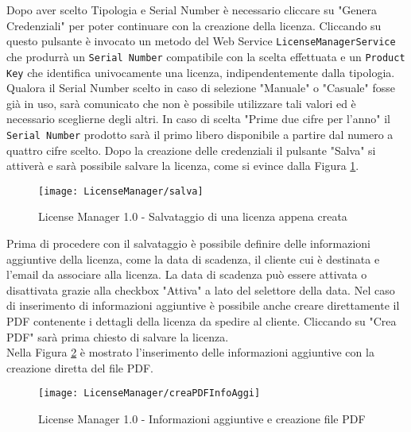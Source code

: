 Dopo aver scelto Tipologia e Serial Number è necessario cliccare su "Genera Credenziali" per poter continuare con la creazione della licenza. Cliccando su questo pulsante è invocato un metodo del Web Service \texttt{LicenseManagerService} che produrrà un \texttt{Serial Number} compatibile con la scelta effettuata e un \texttt{Product Key} che identifica univocamente una licenza, indipendentemente dalla tipologia. Qualora il Serial Number scelto in caso di selezione "Manuale" o "Casuale" fosse già in uso, sarà comunicato che non è possibile utilizzare tali valori ed è necessario sceglierne degli altri. In caso di scelta "Prime due cifre per l’anno" il \texttt{Serial Number} prodotto sarà il primo libero disponibile a partire dal numero a quattro cifre scelto. Dopo la creazione delle credenziali il pulsante "Salva" si attiverà e sarà possibile salvare la licenza, come si evince dalla Figura \ref{salva}.

 \begin{figure}[!h] 
    \centering 
    \texttt{[image: LicenseManager/salva]} 
    \caption{License Manager 1.0 - Salvataggio di una licenza appena creata}
\label{salva}
\end{figure}

Prima di procedere con il salvataggio è possibile definire delle informazioni aggiuntive della licenza, come la data di scadenza, il cliente cui è destinata e l’email da associare alla licenza. La data di scadenza può essere attivata o disattivata grazie alla checkbox "Attiva" a lato del selettore della data. Nel caso di inserimento di informazioni aggiuntive è possibile anche creare direttamente il PDF contenente i dettagli della licenza da spedire al cliente. Cliccando su "Crea PDF" sarà prima chiesto di salvare la licenza.
\\Nella Figura \ref{pdf} è mostrato l'inserimento delle informazioni aggiuntive con la creazione diretta del file PDF.


\begin{figure}[!h] 
    \centering 
    \texttt{[image: LicenseManager/creaPDFInfoAggi]} 
    \caption{License Manager 1.0 - Informazioni aggiuntive e creazione file PDF}
\label{pdf}
\end{figure}

